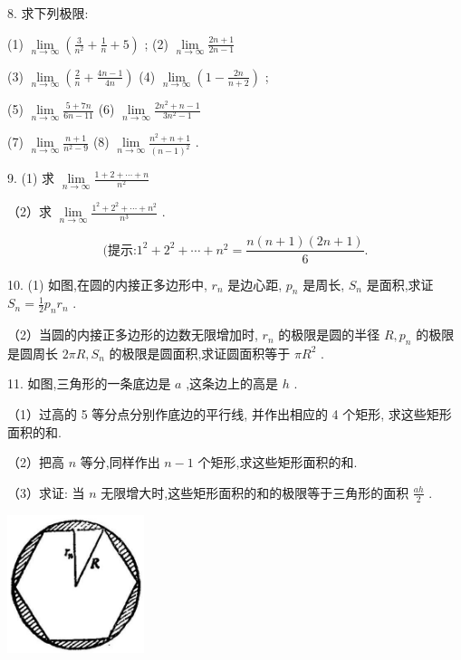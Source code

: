 \documentclass[10pt]{article}
\begin{document}
8. 求下列极限:

(1) \(\mathop{\lim }\limits_{{n \rightarrow \infty }}\left( {\frac{3}{{n}^{2}} + \frac{1}{n} + 5}\right)\) ; (2) \(\mathop{\lim }\limits_{{n \rightarrow \infty }}\frac{{2n} + 1}{{2n} - 1}\)

(3) \(\mathop{\lim }\limits_{{n \rightarrow \infty }}\left( {\frac{2}{n} + \frac{{4n} - 1}{4n}}\right)\) (4) \(\mathop{\lim }\limits_{{n \rightarrow \infty }}\left( {1 - \frac{2n}{n + 2}}\right)\) ;

(5) \(\mathop{\lim }\limits_{{n \rightarrow \infty }}\frac{5 + {7n}}{{6n} - {11}}\) (6) \(\mathop{\lim }\limits_{{n \rightarrow \infty }}\frac{2{n}^{2} + n - 1}{3{n}^{2} - 1}\)

(7) \(\mathop{\lim }\limits_{{n \rightarrow \infty }}\frac{n + 1}{{n}^{2} - 9}\) (8) \(\mathop{\lim }\limits_{{n \rightarrow \infty }}\frac{{n}^{2} + n + 1}{{\left( n - 1\right) }^{2}}\) .

9. (1) 求 \(\mathop{\lim }\limits_{{n \rightarrow \infty }}\frac{1 + 2 + \cdots + n}{{n}^{2}}\)

（2）求 \(\mathop{\lim }\limits_{{n \rightarrow \infty }}\frac{{1}^{2} + {2}^{2} + \cdots + {n}^{2}}{{n}^{3}}\) .

\[
\text{(提示:}{1}^{2} + {2}^{2} + \cdots + {n}^{2} = \frac{n\left( {n + 1}\right) \left( {{2n} + 1}\right) }{6}\text{.}
\]

10. (1) 如图,在圆的内接正多边形中, \({r}_{n}\) 是边心距, \({p}_{n}\) 是周长, \({S}_{n}\) 是面积,求证 \({S}_{n} = \frac{1}{2}{p}_{n}{r}_{n}\) .

（2）当圆的内接正多边形的边数无限增加时, \({r}_{n}\) 的极限是圆的半径 \(R,{p}_{n}\) 的极限是圆周长 \({2\pi R},{S}_{n}\) 的极限是圆面积,求证圆面积等于 \(\pi {R}^{2}\) .

11. 如图,三角形的一条底边是 \(a\) ,这条边上的高是 \(h\) .

（1）过高的 5 等分点分别作底边的平行线, 并作出相应的 4 个矩形, 求这些矩形面积的和.

（2）把高 \(n\) 等分,同样作出 \(n - 1\) 个矩形,求这些矩形面积的和.

（3）求证: 当 \(n\) 无限增大时,这些矩形面积的和的极限等于三角形的面积 \(\frac{ah}{2}\) .

\begin{center}
\includegraphics[max width=0.3\textwidth]{images/01912c18-5c3f-733d-b775-749ba9897a9d_20_155049.jpg}
\end{center}
\end{document}
